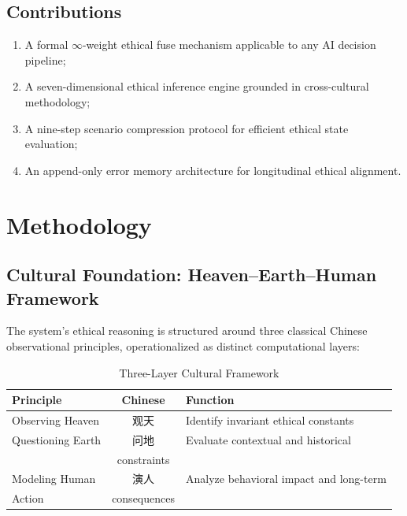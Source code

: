 \documentclass[conference]{IEEEtran}
\begin{document}
\subsection{Contributions}

\begin{enumerate}
  \item A formal $\infty$-weight ethical fuse mechanism
        applicable to any AI decision pipeline;
  \item A seven-dimensional ethical inference engine grounded
        in cross-cultural methodology;
  \item A nine-step scenario compression protocol for efficient
        ethical state evaluation;
  \item An append-only error memory architecture for longitudinal
        ethical alignment.
\end{enumerate}

\section{Methodology}

\subsection{Cultural Foundation: Heaven--Earth--Human Framework}

The system's ethical reasoning is structured around three
classical Chinese observational principles, operationalized
as distinct computational layers:

\begin{table}[!ht]
\caption{Three-Layer Cultural Framework}
\label{tab:cultural}
\centering
\renewcommand{\arraystretch}{1.15}
\begin{tabular}{lcl}
\toprule
\textbf{Principle} & \textbf{Chinese} & \textbf{Function} \\
\midrule
Observing Heaven & 观天 & Identify invariant ethical constants \\
Questioning Earth & 问地 & Evaluate contextual and historical \\
                 &        constraints \\
Modeling Human   & 演人 & Analyze behavioral impact and long-term \\
Action           &        consequences \\
\bottomrule
\end{tabular}
\end{table}
\end{document}
